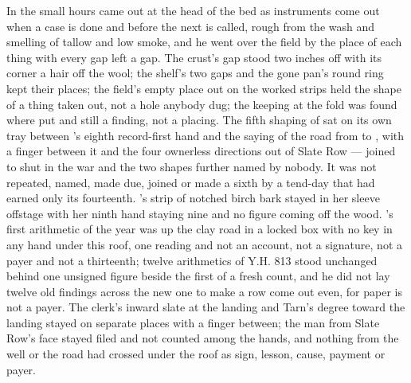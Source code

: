 In the small hours  came out at the head of the bed as instruments come out when a case is done and before the next is called, rough from the wash and smelling of tallow and low smoke, and he went over the field by the place of each thing with every gap left a gap. The crust's gap stood two inches off with its corner a hair off the wool; the shelf's two gaps and the gone pan's round ring kept their places; the field's empty place out on the worked strips held the shape of a thing taken out, not a hole anybody dug; the keeping at the fold was found where put and still a finding, not a placing. The fifth shaping of  sat on its own tray between 's eighth record-first hand and the saying of the road from  to , with a finger between it and the four ownerless directions out of Slate Row ---  joined to  shut in the war and the two shapes further named by nobody. It was not repeated, named, made due, joined or made a sixth by a tend-day that had earned only its fourteenth. 's strip of notched birch bark stayed in her sleeve offstage with her ninth hand staying nine and no figure coming off the wood. 's first arithmetic of the year was up the clay road in a locked box with no key in any hand under this roof, one reading and not an account, not a signature, not a payer and not a thirteenth; twelve arithmetics of Y.H. 813 stood unchanged behind one unsigned figure beside the first of a fresh count, and he did not lay twelve old findings across the new one to make a row come out even, for paper is not a payer. The clerk's inward slate at the landing and Tarn's degree toward the landing stayed on separate places with a finger between; the man from Slate Row's face stayed filed and not counted among the hands, and nothing from the well or the road had crossed under the roof as sign, lesson, cause, payment or payer.

